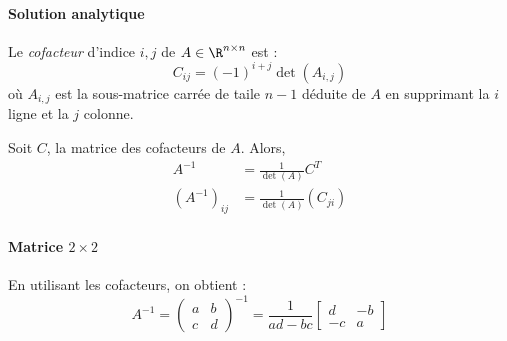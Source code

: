                 \paragraph{Solution analytique}
                    \begin{definition}
                        Le \textit{cofacteur} d'indice \(i,j\) de \(A\in\R^{n\times n}\) est :
                        \[
                            C_{ij} = (-1)^{i+j} \det(A_{i,j})
                        \]
                        où \(A_{i,j}\) est la sous-matrice carrée de taile \(n-1\) déduite de \(A\) en supprimant la \(i\)\ieme{} ligne et la \(j\)\ieme{} colonne.
                    \end{definition}

                    Soit \(C\), la matrice des cofacteurs de \(A\). Alors,
                    \begin{align*}
                        A^{-1} &= \frac{1}{\det(A)} C^T\\
                        (A^{-1})_{ij} &= \frac{1}{\det(A)} (C_{ji})
                    \end{align*}

                \paragraph{Matrice \(2 \times 2\)}
                    En utilisant les cofacteurs, on obtient :
                    \[
                        A^{-1} = \begin{pmatrix}
                            a & b\\
                            c & d
                        \end{pmatrix}^{-1} = \frac{1}{ad - bc} \begin{bmatrix}
                            d & -b\\
                            -c & a
                        \end{bmatrix}
                    \]